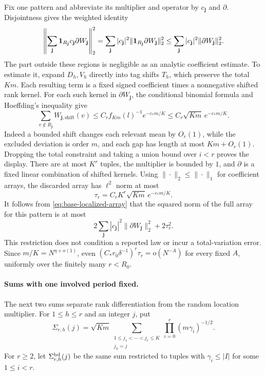Fix one pattern and abbreviate its multiplier and operator by
\(c_{\mathbf j}\) and \(\partial\). Disjointness gives the weighted identity
\begin{equation}\label{eq:base-localized-array}
 \left\|\sum_{\mathbf j}{\bf1}_{R_{\mathbf j}}
                  c_{\mathbf j}\partial W_{\mathbf j}\right\|_2^2
 =\sum_{\mathbf j}|c_{\mathbf j}|^2
        \|{\bf1}_{R_{\mathbf j}}\partial W_{\mathbf j}\|_2^2
 \le\sum_{\mathbf j}|c_{\mathbf j}|^2
        \|\partial W_{\mathbf j}\|_2^2.
\end{equation}
The part outside these regions is negligible as an analytic coefficient estimate. To estimate it, expand \(D_h,V_h\) directly into tag shifts \(T_h\), which preserve the total \(Km\). Each resulting term is a fixed signed coefficient times a nonnegative shifted rank kernel. For each such kernel in \(\partial W_{\mathbf j}\), the conditional binomial formula and Hoeffding's inequality \cite[Theorem~2]{Hoeffding1963} give
\[
 \sum_{v\notin R_{\mathbf j}}W_{\mathbf j,\mathrm{shift}}(v)
 \le C_r f_{Km}(l)^{-1}e^{-c_* m/K}
 \le C_r\sqrt{Km}\,e^{-c_* m/K}.
\]
Indeed a bounded shift changes each relevant mean by \(O_r(1)\), while the excluded deviation is order \(m\), and each gap has length at most \(Km+O_r(1)\). Dropping the total constraint and taking a union bound over \(i<r\) proves the display. There are at most \(K^r\) tuples, the multiplier is bounded by \(1\), and \(\partial\) is a fixed linear combination of shifted kernels. Using \(\|\cdot\|_2\le\|\cdot\|_1\) for coefficient arrays, the discarded array has \(\ell^2\) norm at most
\[
 \tau_r=C_rK^r\sqrt{Km}\,e^{-c_* m/K}.
\]
It follows from \eqref{eq:base-localized-array} that the squared norm of the full array for this pattern is at most
\[
 2\sum_{\mathbf j}|c_{\mathbf j}|^2
        \|\partial W_{\mathbf j}\|_2^2+2\tau_r^2.
\]
This restriction does not condition a reported law or incur a total-variation error. Since \(m/K=N^{\eta+o(1)}\), even
\((C_*r_0\delta^{-1})^r\tau_r=o(N^{-A})\) for every fixed \(A\), uniformly over the finitely many \(r<R_0\).

\paragraph{Sums with one involved period fixed.}
The next two sums separate rank differentiation from the random location multiplier. For \(1\le h\le r\) and an integer \(j\), put
\[
 \Sigma_{r,h}(j)=\sqrt{Km}
 \sum_{\substack{1\le j_1<\cdots<j_r\le K\\j_h=j}}
             \prod_{i=0}^r(m\gamma_i)^{-1/2}.
\]
For \(r\ge2\), let \(\Sigma_{r,h}^{\rm bd}(j)\) be the same sum restricted to tuples with \(\gamma_i\le|I|\) for some \(1\le i<r\).

